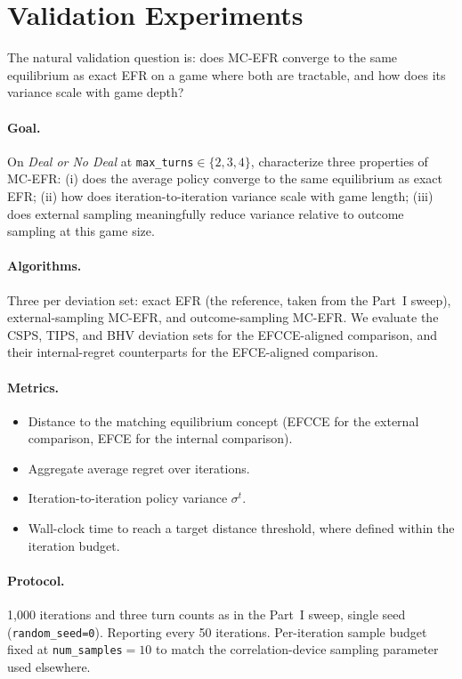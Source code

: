 \documentclass[11pt]{article}
\begin{document}
\section{Validation Experiments}
\label{sec:mcefr_validation}

The natural validation question is: does MC-EFR converge to the same equilibrium as exact EFR on a game where both are tractable, and how does its variance scale with game depth?

\paragraph{Goal.} On \emph{Deal or No Deal} at \texttt{max\_turns}$\in\{2,3,4\}$, characterize three properties of MC-EFR: (i) does the average policy converge to the same equilibrium as exact EFR; (ii) how does iteration-to-iteration variance scale with game length; (iii) does external sampling meaningfully reduce variance relative to outcome sampling at this game size.

\paragraph{Algorithms.} Three per deviation set: exact EFR (the reference, taken from the Part~I sweep), external-sampling MC-EFR, and outcome-sampling MC-EFR. We evaluate the CSPS, TIPS, and BHV deviation sets for the EFCCE-aligned comparison, and their internal-regret counterparts for the EFCE-aligned comparison.

\paragraph{Metrics.}
\begin{itemize}
    \item Distance to the matching equilibrium concept (EFCCE for the external comparison, EFCE for the internal comparison).
    \item Aggregate average regret over iterations.
    \item Iteration-to-iteration policy variance $\sigma^t$.
    \item Wall-clock time to reach a target distance threshold, where defined within the iteration budget.
\end{itemize}

\paragraph{Protocol.} 1{,}000 iterations and three turn counts as in the Part~I sweep, single seed (\texttt{random\_seed=0}). Reporting every 50 iterations. Per-iteration sample budget fixed at \texttt{num\_samples}$=10$ to match the correlation-device sampling parameter used elsewhere.
\end{document}
